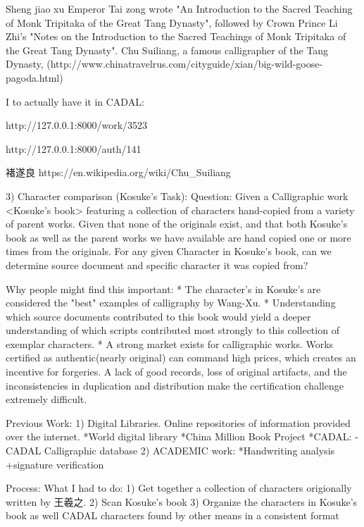 Sheng jiao xu
 Emperor Tai zong wrote "An Introduction to the Sacred Teaching of Monk Tripitaka of the Great Tang Dynasty", followed by Crown Prince Li Zhi's "Notes on the Introduction to the Sacred Teachings of Monk Tripitaka of the Great Tang Dynasty". Chu Suiliang, a famous calligrapher of the Tang Dynasty, (http://www.chinatravelrus.com/cityguide/xian/big-wild-goose-pagoda.html)



I to actually have it in CADAL:

http://127.0.0.1:8000/work/3523

http://127.0.0.1:8000/auth/141

褚遂良
https://en.wikipedia.org/wiki/Chu_Suiliang



3)  Character comparison (Kosuke's Task):
    Question:   Given a Calligraphic work <Kosuke's book> featuring a collection of characters hand-copied from a variety of parent works.
                Given that none of the originals exist, and that both Kosuke's book as well as the parent works we have available are hand copied one or more times from the originals.
                For any given Character in Kosuke's book, can we determine source document and specific character it was copied from?
                
Why people might find this important:
    *  The character's in Kosuke's are considered the "best" examples of calligraphy by Wang-Xu.
    *  Understanding which source documents contributed to this book would yield a deeper understanding of which scripts contributed most strongly to this collection of exemplar characters.
    *  A strong market exists for calligraphic works.  Works certified as authentic(nearly original) can command high prices, which creates an incentive for forgeries.  A lack of good records, loss of original artifacts, and the inconsistencies in duplication and distribution make the certification challenge extremely difficult.
    
Previous Work:
    1) Digital Libraries.  Online repositories of information provided over the internet.
        *World digital library
        *China Million Book Project
            *CADAL:
                -CADAL Calligraphic database
    2) ACADEMIC work:
        *Handwriting analysis
            +signature verification
            

Process:  What I had to do:
    1)  Get together a collection of characters origionally written by 王羲之.
    2)  Scan Kosuke's book
    3)  Organize the characters in Kosuke's book as well CADAL characters found by other means in a consistent format
    
